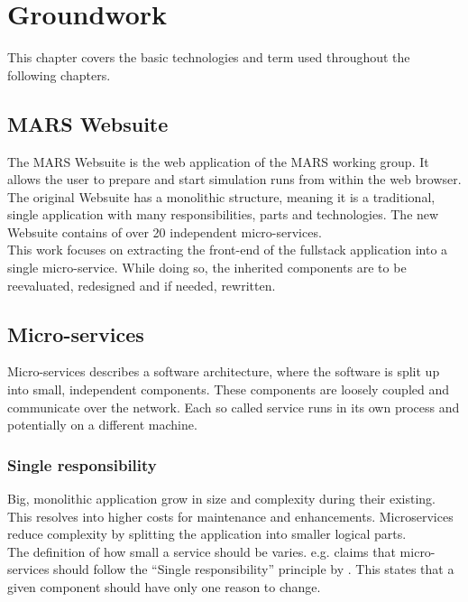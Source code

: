 
\chapter{Groundwork}
This chapter covers the basic technologies and term used throughout the following chapters.



\section{MARS Websuite}
The MARS Websuite is the web application of the MARS working group. It allows the user to prepare and start simulation runs from within the web browser.\\
The original Websuite has a monolithic structure, meaning it is a traditional, single application with many responsibilities, parts and technologies. The new Websuite contains of over 20 independent micro-services.\\
This work focuses on extracting the front-end of the fullstack application into a single micro-service. While doing so, the inherited components are to be reevaluated, redesigned and if needed, rewritten.



\section{Micro-services}
\label{sec:micro-services}
Micro-services describes a software architecture, where the software is split up into small, independent components. These components are loosely coupled and communicate over the network. Each so called service runs in its own process and potentially on a different machine.


\subsection{Single responsibility}
Big, monolithic application grow in size and complexity during their existing. This resolves into higher costs for maintenance and enhancements. Microservices reduce complexity by splitting the application into smaller logical parts.\\
The definition of how small a service should be varies. \cite{newman2015building} e.g. claims that micro-services should follow the \enquote{Single responsibility} principle by \cite{martin2003agile}. This states that a given component should have only one reason to change.


